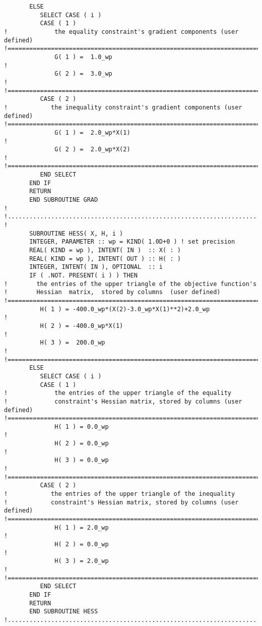 \documentclass{galahad}
\begin{document}
{\begin{verbatim}
       ELSE
          SELECT CASE ( i )
          CASE ( 1 )
!             the equality constraint's gradient components (user defined)
!==============================================================================
              G( 1 ) =  1.0_wp                                                !
              G( 2 ) =  3.0_wp                                                !
!==============================================================================
          CASE ( 2 )
!            the inequality constraint's gradient components (user defined)
!==============================================================================
              G( 1 ) =  2.0_wp*X(1)                                           !
              G( 2 ) =  2.0_wp*X(2)                                           !
!==============================================================================
          END SELECT
       END IF
       RETURN
       END SUBROUTINE GRAD
!
!.............................................................................
!
       SUBROUTINE HESS( X, H, i )
       INTEGER, PARAMETER :: wp = KIND( 1.0D+0 ) ! set precision
       REAL( KIND = wp ), INTENT( IN )  :: X( : )
       REAL( KIND = wp ), INTENT( OUT ) :: H( : )
       INTEGER, INTENT( IN ), OPTIONAL  :: i
       IF ( .NOT. PRESENT( i ) ) THEN
!        the entries of the upper triangle of the objective function's
!        Hessian  matrix,  stored by columns  (user defined)
!==============================================================================
          H( 1 ) = -400.0_wp*(X(2)-3.0_wp*X(1)**2)+2.0_wp                     !
          H( 2 ) = -400.0_wp*X(1)                                             !
          H( 3 ) =  200.0_wp                                                  !
!==============================================================================
       ELSE
          SELECT CASE ( i )
          CASE ( 1 )
!             the entries of the upper triangle of the equality
!             constraint's Hessian matrix, stored by columns (user defined)
!==============================================================================
              H( 1 ) = 0.0_wp                                                 !
              H( 2 ) = 0.0_wp                                                 !
              H( 3 ) = 0.0_wp                                                 !
!==============================================================================
          CASE ( 2 )
!            the entries of the upper triangle of the inequality
!            constraint's Hessian matrix, stored by columns (user defined)
!==============================================================================
              H( 1 ) = 2.0_wp                                                 !
              H( 2 ) = 0.0_wp                                                 !
              H( 3 ) = 2.0_wp                                                 !
!==============================================================================
          END SELECT
       END IF
       RETURN
       END SUBROUTINE HESS
!..............................................................................
\end{verbatim} }\def\baselinestretch{1.0}
\end{document}
